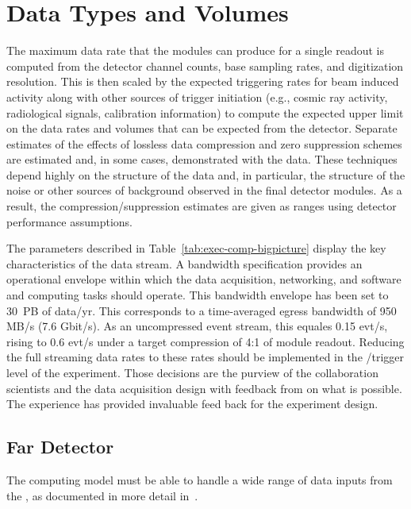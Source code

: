 \section{Data Types and Volumes}

The maximum data rate that the   modules can produce for a single readout is computed from the detector channel counts, base sampling rates, and digitization resolution.  This is then scaled by the expected triggering rates for beam induced activity along with other sources of trigger initiation (e.g., cosmic ray activity, radiological signals, calibration information) to compute the expected upper limit on the data rates and volumes that can be expected from the detector.  Separate estimates of the effects of lossless data compression and zero suppression schemes are estimated and, in some cases, demonstrated with the   data.  These techniques depend highly on the structure of the data and, in particular, the structure of the noise or other sources of background observed in the final  detector modules.  As a result, the compression/suppression estimates are given as ranges using detector performance assumptions.

The parameters described in Table~\ref{tab:exec-comp-bigpicture} display the key characteristics of the   data stream.  A bandwidth specification provides an operational envelope within which the data acquisition, networking, and software and computing tasks should  operate. This bandwidth envelope has been set to  30~PB of data/yr.  This corresponds to a time-averaged egress bandwidth  of 950 MB/s (7.6 Gbit/s).  As an uncompressed event stream, this equales 0.15 evt/s, rising to 0.6 evt/s under a target compression of 4:1 of  module readout. Reducing the full streaming data rates to these rates should be implemented in the /trigger level of the experiment. 
Those decisions are the purview of the collaboration scientists and the data acquisition design with feedback from  on what is possible.  The  experience has provided invaluable feed back for the experiment design. 

\subsection{Far Detector}

The computing model must be able to handle a wide range of data inputs from the , as documented in more detail in~\cite{bib:docdb9240}.

